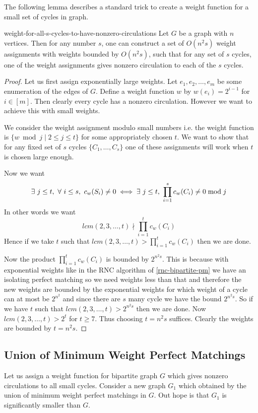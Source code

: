 The following lemma describes a standard trick to create a weight function for a small set of cycles in graph.
\begin{lemma}{\cite{ChariRohatgiSrinivasan_1993_Rou_CONF}}{weight-for-all-s-cycles-to-have-nonzero-circulations}
	Let $G$ be a graph with $n$ vertices. Then for any number $s$, one can construct a set of $O(n^2s)$ weight assignments with weights bounded by $O(n^2s)$, such that for any set of $s$ cycles, one of the weight assignments gives nonzero circulation to each of the $s$ cycles.
\end{lemma}
\begin{proof}
	Let us first assign exponentially large weights. Let $e_1, e_2,\dots , e_m$ be some enumeration of the edges of $G$. Define  a weight function $w$ by $w(e_i)=2^{i-1}$ for $i\in [m]$. Then clearly every cycle has a nonzero circulation. However we want to achieve this with small weights.
	
We consider the weight assignment modulo small numbers i.e. the weight function is $\{w\bmod j\mid 2\leq j\leq t\}$ for some appropriately chosen $t$. We want to show that for any fixed set of $s$ cycles $\{C_1,\dots, C_s\}$ one of these assignments will work when $t$ is chosen large enough. 
	
	Now we want $$\exs\ j\leq t,\ \forall\ i\leq s,\ c_w(S_i)\neq 0\iff \exs\ j\leq t,\ \prod_{i=1}^s c_w(C_i)\neq 0\bmod j$$In other words we want $$lcm(2,3,\dots, t)\nmid \prod_{i=1}^t c_w(C_i)$$Hence if we take $t$ such that $lcm(2,3,\dots, t)> \prod\limits_{i=1}^t c_w(C_i)$ then we are done. 
	
	Now the product $\prod\limits_{i=1}^t c_w(C_i)$ is bounded by $2^{n^2s}$. This is because with exponential weights {like in the RNC algorithm} of \autoref{rnc-bipartite-pm} we have an isolating perfect matching so we need weights less than that and therefore the new weights are bounded by the exponential weights for which weight of a cycle can at most be $2^{n^2}$ and since there are $s$ many cycle we have the bound $2^{n^2s}$. So if we have $t$ such that $lcm(2,3,\dots, t)>2^{n^2s}$ then we are done. Now $lcm(2,3,\dots,t)>2^t$ for $t\geq 7$. Thus choosing $t=n^2s$ suffices. Clearly the weights are bounded by $t=n^2s$.
\end{proof}

\subsection{Union of Minimum Weight Perfect Matchings}
Let us assign a weight function for bipartite graph $G$ which gives nonzero circulations to all small cycles. Consider a new graph $G_1$ which obtained by the union of minimum weight perfect matchings in $G$. Out hope is that $G_1$ is significantly smaller than $G$.

